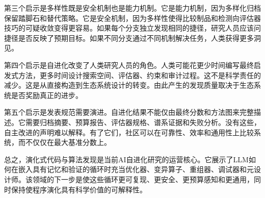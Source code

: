 第三个启示是多样性既是安全机制也是能力机制。它是能力机制，因为多样化归档保留踏脚石和替代策略。它是安全机制，因为多样性使得比较制品和检测向评估器技巧的可疑收敛变得更容易。如果每个分支独立发现相同的捷径，研究人员应该问捷径是否反映了预期目标。如果不同分支通过不同机制解决任务，人类获得更多洞见。

第四个启示是自进化改变了人类研究人员的角色。人类可能花更少时间编写最终启发式方法，更多时间设计搜索空间、评估器、约束和审计过程。这不是科学责任的减少。这是从直接构造到生态系统设计的转变。由此产生的发现质量取决于生态系统是否奖励真正的进步。

第五个启示是发表规范需要演进。自进化结果不能仅由最终分数和方法图来完整描述。它需要归档摘要、预算报告、评估器规格、谱系证据和失败分析。没有这些，自主改进的声明难以解释。有了它们，社区可以在可靠性、效率和通用性上比较系统，而不仅仅在最大基准分数上。

总之，演化式代码与算法发现是当前AI自进化研究的运营核心。它展示了LLM如何在嵌入具有记忆和验证的循环时充当优化器、变异算子、重组器、调试器和元设计师。该领域的下一步是使这些循环更可复现、更安全、更预算感知和更通用，同时保持使程序演化具有科学价值的可解释性。

